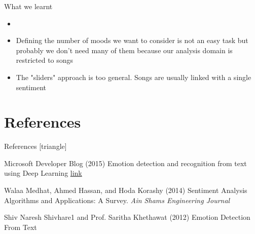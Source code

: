 \documentclass[xcolor=dvipsnames]{beamer}
\begin{document}
\begin{frame}{What we learnt}
\begin{itemize}
\item 
\item Defining the number of moods we want to consider is not an easy task but probably we don't
	need many of them because our analysis domain is restricted to songs
\item The "sliders" approach is too general. Songs are usually linked with a single sentiment
\end{itemize}
\end{frame}


\section{References}
\begin{frame}{References}
[triangle]
 \begin{thebibliography}{99} %
 Microsoft Developer Blog (2015)
\newblock Emotion detection and recognition from text using Deep Learning
\newblock \href{https://www.microsoft.com/developerblog/2015/11/29/emotion-detection-and-recognition-from-text-using-deep-learning/}{link}

 Walaa Medhat, Ahmed Hassan, and Hoda Korashy (2014)
\newblock Sentiment Analysis Algorithms and Applications: A Survey.
\newblock \emph{Ain Shams Engineering Journal}

 Shiv Naresh Shivhare1 and Prof. Saritha Khethawat (2012)
\newblock Emotion Detection From Text

\end{thebibliography}

\end{frame}
\end{document}
